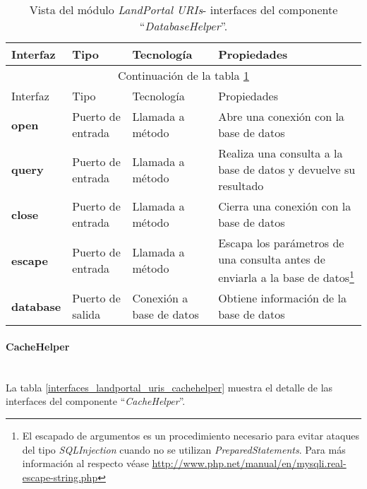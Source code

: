 \begin{longtable}[c]{|p{25mm}|p{20mm}|p{30mm}|p{60mm}|}
	\caption{Vista del módulo \textit{LandPortal URIs}- interfaces del componente ``\textit{DatabaseHelper}''. \label{interfaces_landportal_uris_databasehelper}}\\
		\hline
			Interfaz & Tipo & Tecnología & Propiedades\\
		\hline
		\hline
	\endfirsthead
		\hline
		\multicolumn{4}{|c|}{Continuación de la tabla \ref{interfaces_landportal_uris_databasehelper}}\\
		\hline
			Interfaz & Tipo & Tecnología & Propiedades\\
		\hline
		\hline
	\endhead
	\hline
	\endfoot
		\textbf{open} & Puerto de entrada & Llamada a método & Abre una conexión con la base de datos \\
		\hline
		\textbf{query} & Puerto de entrada & Llamada a método & Realiza una consulta a la base de datos y devuelve su resultado \\
		\hline
		\textbf{close} & Puerto de entrada & Llamada a método & Cierra una conexión con la base de datos \\
		\hline
		\textbf{escape} & Puerto de entrada & Llamada a método & Escapa los parámetros de una consulta antes de enviarla a la base de datos\footnote{El escapado de argumentos es un procedimiento necesario para evitar ataques del tipo \textit{SQLInjection} cuando no se utilizan \textit{PreparedStatements}.  Para más información al respecto véase \url{http://www.php.net/manual/en/mysqli.real-escape-string.php}} \\
		\hline
		\textbf{database} & Puerto de salida & Conexión a base de datos & Obtiene información de la base de datos \\
	\hline
	\hline
\end{longtable}


\paragraph{CacheHelper} \hfill \\
La tabla \ref{interfaces_landportal_uris_cachehelper} muestra el detalle de las interfaces del componente ``\textit{CacheHelper}''.  

